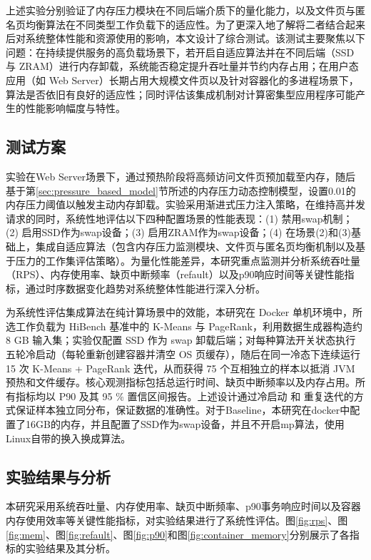 上述实验分别验证了内存压力模块在不同后端介质下的量化能力，以及文件页与匿名页均衡算法在不同类型工作负载下的适应性。为了更深入地了解将二者结合起来后对系统整体性能和资源使用的影响，本文设计了综合测试。该测试主要聚焦以下问题：在持续提供服务的高负载场景下，若开启自适应算法并在不同后端（SSD 与 ZRAM）进行内存卸载，系统能否稳定提升吞吐量并节约内存占用；在用户态应用（如 Web Server）长期占用大规模文件页以及针对容器化的多进程场景下，算法是否依旧有良好的适应性；同时评估该集成机制对计算密集型应用程序可能产生的性能影响幅度与特性。

\subsection{测试方案}

实验在Web Server场景下，通过预热阶段将高频访问文件页预加载至内存，随后基于第\ref{sec:pressure_based_model}节所述的内存压力动态控制模型，设置0.01的内存压力阈值以触发主动内存卸载。实验采用渐进式压力注入策略，在维持高并发请求的同时，系统性地评估以下四种配置场景的性能表现：(1) 禁用swap机制；(2) 启用SSD作为swap设备；(3) 启用ZRAM作为swap设备；(4) 在场景(2)和(3)基础上，集成自适应算法（包含内存压力监测模块、文件页与匿名页均衡机制以及基于压力的工作集评估策略）。为量化性能差异，本研究重点监测并分析系统吞吐量（RPS）、内存使用率、缺页中断频率（refault）以及p90响应时间等关键性能指标，通过时序数据变化趋势对系统整体性能进行深入分析。

为系统性评估集成算法在纯计算场景中的效能，本研究在 Docker 单机环境中，所选工作负载为 HiBench 基准中的 K-Means 与 PageRank，利用数据生成器构造约 8 GB 输入集；实验仅配置 SSD 作为 swap 卸载后端；对每种算法开关状态执行五轮冷启动（每轮重新创建容器并清空 OS 页缓存），随后在同一冷态下连续运行 15 次 K-Means + PageRank 迭代，从而获得 75 个互相独立的样本以抵消 JVM 预热和文件缓存。核心观测指标包括总运行时间、缺页中断频率以及内存占用。所有指标均以 P90 及其 95 \% 置信区间报告。上述设计通过冷启动 和 重复迭代的方式保证样本独立同分布，保证数据的准确性。对于Baseline，本研究在docker中配置了16GB的内存，并且配置了SSD作为swap设备，并且不开启mp算法，使用Linux自带的换入换成算法。


\subsection{实验结果与分析}
\label{sec:test_result}
本研究采用系统吞吐量、内存使用率、缺页中断频率、p90事务响应时间以及容器内存使用效率等关键性能指标，对实验结果进行了系统性评估。图\ref{fig:rps}、图\ref{fig:mem}、图\ref{fig:refault}、图\ref{fig:p90}和图\ref{fig:container_memory}分别展示了各指标的实验结果及其分析。

